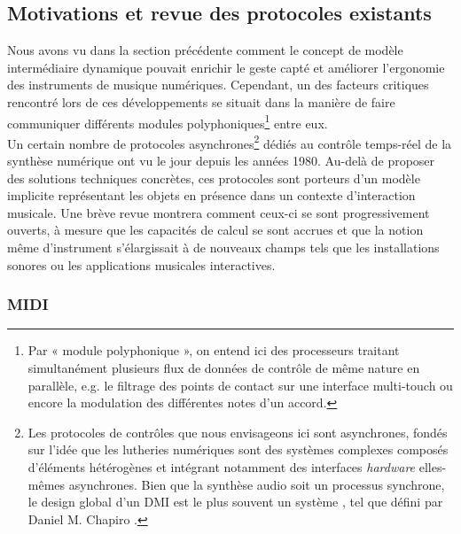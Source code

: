 \subsection{Motivations et revue des protocoles existants}

\noindent Nous avons vu dans la section précédente comment le concept de modèle intermédiaire dynamique pouvait enrichir le geste capté et améliorer l’ergonomie des instruments de musique numériques. Cependant, un des facteurs critiques rencontré lors de ces développements se situait dans la manière de faire communiquer différents modules polyphoniques\footnote{Par « module polyphonique », on entend ici des processeurs traitant simultanément plusieurs flux de données de contrôle de même nature en parallèle, e.g. le filtrage des points de contact sur une interface multi-touch ou encore la modulation des différentes notes d'un accord.} entre eux.\\
\indent Un certain nombre de protocoles asynchrones\footnote{Les protocoles de contrôles que nous envisageons ici sont asynchrones, fondés sur l’idée que les lutheries numériques sont des systèmes complexes composés d’éléments hétérogènes et intégrant notamment des interfaces \textit{hardware} elles-mêmes asynchrones. Bien que la synthèse audio soit un processus synchrone, le design global d'un \gls{DMI} est le plus souvent un système , tel que défini par Daniel M. Chapiro \cite{chapiro_globally-asynchronous_1984}.} dédiés au contrôle temps-réel de la synthèse numérique ont vu le jour depuis les années 1980. Au-delà de proposer des solutions techniques concrètes, ces protocoles sont porteurs d’un modèle implicite représentant les objets en présence dans un contexte d'interaction musicale. Une brève revue montrera comment ceux-ci se sont progressivement ouverts, à mesure que les capacités de calcul se sont accrues et que la notion même d’instrument s’élargissait à de nouveaux champs tels que les installations sonores ou les applications musicales interactives.

\subsubsection{MIDI}

